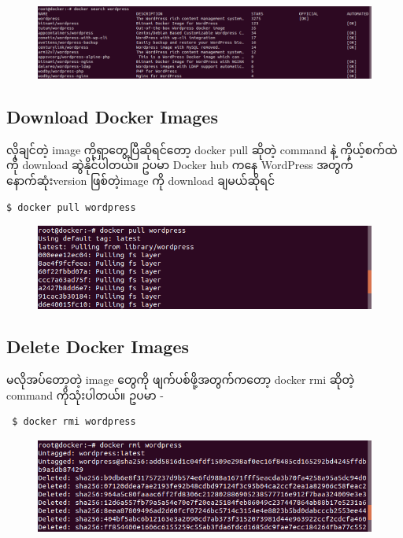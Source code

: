 \begin{figure}[htbp]
\centering
\includegraphics{.gitbook/assets/2_search-large-resolution.png}
\end{figure}

\subsection{Download Docker Images}\label{download-docker-images}

လိုချင်တဲ့ image ကိုရှာတွေ့ပြီဆိုရင်တော့ docker pull ဆိုတဲ့ command နဲ့
ကိုယ့်စက်ထဲကို download ဆွဲနိုင်ပါတယ်။ ဥပမာ Docker hub ကနေ WordPress
အတွက်နောက်ဆုံးversion ဖြစ်တဲ့image ကို download ချမယ်ဆိုရင်

\begin{verbatim}
$ docker pull wordpress
\end{verbatim}

\begin{figure}[htbp]
\centering
\includegraphics{.gitbook/assets/3_pull_wordpress.png}
\end{figure}

\subsection{Delete Docker Images}\label{delete-docker-images}

မလိုအပ်တော့တဲ့ image တွေကို ဖျက်ပစ်ဖို့အတွက်ကတော့ docker rmi ဆိုတဲ့
command ကိုသုံးပါတယ်။ ဥပမာ -

\begin{verbatim}
 $ docker rmi wordpress
\end{verbatim}

\begin{figure}[htbp]
\centering
\includegraphics{.gitbook/assets/4_rmi.png}
\end{figure}

